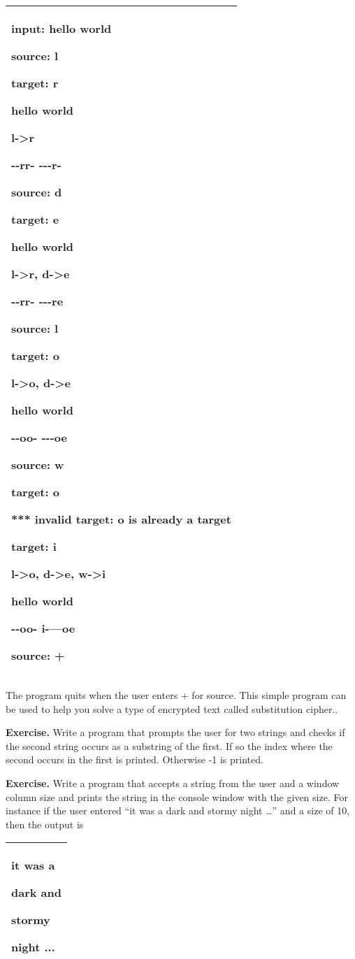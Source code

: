 \documentclass[
]{article}
\begin{document}
\begin{longtable}[]{@{}l@{}}
\toprule
\endhead
\begin{minipage}[t]{0.97\columnwidth}\raggedright
input: hello world

source: l

target: r

hello world

l-\textgreater r

-\/-rr- -\/-\/-r-

source: d

target: e

hello world

l-\textgreater r, d-\textgreater e

-\/-rr- -\/-\/-re

source: l

target: o

l-\textgreater o, d-\textgreater e

hello world

-\/-oo- -\/-\/-oe

source: w

target: o

*** invalid target: o is already a target

target: i

l-\textgreater o, d-\textgreater e, w-\textgreater i

hello world

-\/-oo- i-\/---oe

source: + \strut
\end{minipage}\tabularnewline
\bottomrule
\end{longtable}

The program quits when the user enters + for source. This simple program
can be used to help you solve a type of encrypted text called
substitution cipher..

\textbf{Exercise. }Write a program that prompts the user for two strings
and checks if the second string occurs as a substring of the first. If
so the index where the second occurs in the first is printed. Otherwise
-1 is printed.

\textbf{Exercise.} Write a program that accepts a string from the user
and a window column size and prints the string in the console window
with the given size. For instance if the user entered ``it was a dark
and stormy night \ldots'' and a size of 10, then the output is

\begin{longtable}[]{@{}l@{}}
\toprule
\endhead
\begin{minipage}[t]{0.97\columnwidth}\raggedright
it was a

dark and

stormy

night ...\strut
\end{minipage}\tabularnewline
\bottomrule
\end{longtable}
\end{document}
